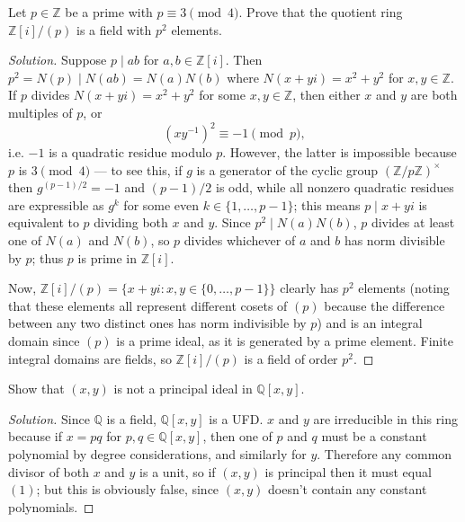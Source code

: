\documentclass[10pt]{article}
\providecommand{\quiv}{\equiv}
\providecommand{\QQ}{\mathbb Q}
\providecommand{\ZZ}{\mathbb Z}
\providecommand{\inv}{^{-1}}
\newenvironment{soln}{\begin{proof}[Solution]}{\end{proof}}
\begin{document}
\begin{problem}
    Let $p\in\ZZ$ be a prime with $p\quiv3\pmod 4$.
    Prove that the quotient ring $\ZZ[i]/(p)$ is a field with $p^2$ elements.
\end{problem}

\begin{soln}
    Suppose $p\mid ab$ for $a,b\in\ZZ[i]$.
    Then $p^2 = N(p)\mid N(ab) = N(a)N(b)$ where $N(x+yi) = x^2 + y^2$ for $x,y\in\ZZ$.
    If $p$ divides $N(x+yi) =x^2 + y^2$ for some $x,y\in\ZZ$, then
    either $x$ and $y$ are both multiples of $p$, or
    \begin{equation*}
	(xy\inv)^2\equiv -1\pmod p,
    \end{equation*}
    i.e. $-1$ is a quadratic residue modulo $p$.
    However, the latter is impossible because $p$ is $3\pmod 4$ ---
    to see this, if $g$ is a generator of the cyclic group $(\ZZ/p\ZZ)^\times$
    then $g^{(p-1)/2} = -1$ and $(p-1)/2$ is odd,
    while all nonzero quadratic residues are expressible as $g^k$
    for some even $k\in\{1,\dots,p-1\}$; this means $p\mid x + yi$
    is equivalent to $p$ dividing both $x$ and $y$.
    Since $p^2\mid N(a)N(b)$, $p$ divides at least one of $N(a)$ and $N(b)$,
    so $p$ divides whichever of $a$ and $b$ has norm divisible by $p$;
    thus $p$ is prime in $\ZZ[i]$.

    Now, $\ZZ[i]/(p) = \{x + yi : x,y\in\{0,\dots,p-1\}\}$
    clearly has $p^2$ elements (noting that these elements
    all represent different cosets of $(p)$ because
    the difference between any two distinct ones has norm indivisible by $p$)
    and is an integral domain since $(p)$ is a prime ideal,
    as it is generated by a prime element. Finite integral domains
    are fields, so $\ZZ[i]/(p)$ is a field of order $p^2$.
\end{soln}

\begin{problem}
    Show that $(x,y)$ is not a principal ideal in $\QQ[x,y]$.
\end{problem}

\begin{soln}
    Since $\QQ$ is a field, $\QQ[x,y]$ is a UFD.
    $x$ and $y$ are irreducible in this ring because
    if $x = pq$ for $p,q\in\QQ[x,y]$,
    then one of $p$ and $q$ must be a constant polynomial
    by degree considerations, and similarly for $y$.
    Therefore any common divisor of both $x$ and $y$ is a unit,
    so if $(x,y)$ is principal then it must equal $(1)$;
    but this is obviously false, since $(x,y)$ doesn't contain
    any constant polynomials.
\end{soln}
\end{document}
